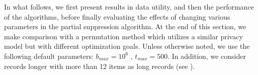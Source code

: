 %
%


In what follows, we first present results in data utility, and then the
performance of the algorithms, before finally evaluating the effects of
changing various parameters in the partial suppression algorithm. At the end
of this section, we make comparison with a permutation method which utilizes
a similar privacy model but with different optimization goals. Unless
otherwise noted, we use the following default parameters: $b_{max} = 10^6$ ,
$t_{max}=500$. In addition, we consider records longer with more than 12 items
as long records (see ).

